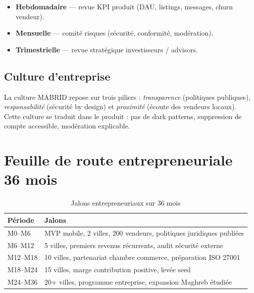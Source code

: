\begin{itemize}
  \item \textbf{Hebdomadaire} --- revue KPI produit (DAU, listings, messages, churn vendeur).
  \item \textbf{Mensuelle} --- comité risques (sécurité, conformité, modération).
  \item \textbf{Trimestrielle} --- revue stratégique investisseurs / advisors.
\end{itemize}

\subsection{Culture d'entreprise}

La culture MABRID repose sur trois piliers : \emph{transparence} (politiques publiques), \emph{responsabilité} (sécurité by design) et \emph{proximité} (écoute des vendeurs locaux). Cette culture se traduit dans le produit : pas de dark patterns, suppression de compte accessible, modération explicable.

\section{Feuille de route entrepreneuriale 36 mois}

\begin{table}[H]
  \centering
  \caption{Jalons entrepreneuriaux sur 36 mois}
  \label{tab:entrepreneur-roadmap}
  \begin{tabularx}{\textwidth}{@{}lX@{}}
    \toprule
    \textbf{Période} & \textbf{Jalons} \\
    \midrule
    M0--M6 & MVP mobile, 2 villes, 200 vendeurs, politiques juridiques publiées \\
    M6--M12 & 5 villes, premiers revenus récurrents, audit sécurité externe \\
    M12--M18 & 10 villes, partenariat chambre commerce, préparation ISO 27001 \\
    M18--M24 & 15 villes, marge contribution positive, levée seed \\
    M24--M36 & 20+ villes, programme entreprise, expansion Maghreb étudiée \\
    \bottomrule
  \end{tabularx}
\end{table}


